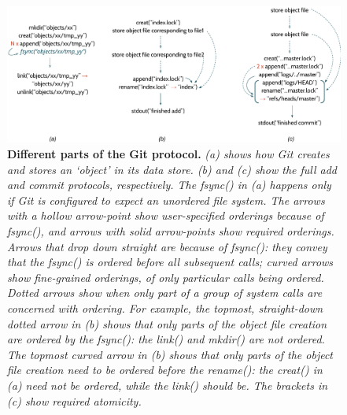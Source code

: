 \begin{figure}[t]
\centering
\includegraphics[width=\textwidth]{figs/git_cropped.pdf}
\caption{\textbf{Different parts of the Git protocol. }\textit{\footnotesize (a) shows how Git creates and stores an `object' in its data store. (b) and (c) show the full add and commit protocols, respectively. The fsync() in (a) happens only if Git is configured to expect an unordered file system. The arrows with a hollow arrow-point show user-specified orderings because of fsync(), and arrows with solid arrow-points show required orderings. Arrows that drop down straight are because of fsync(): they convey that the fsync() is ordered before all subsequent calls; curved arrows show fine-grained orderings, of only particular calls being ordered. Dotted arrows show when only part of a group of system calls are concerned with ordering. For example, the topmost, straight-down dotted arrow in (b) shows that only parts of the object file creation are ordered by the fsync(): the link() and mkdir() are not ordered. The topmost curved arrow in (b) shows that only parts of the object file creation \emph{need} to be ordered before the rename(): the creat() in (a) need not be ordered, while the link() should be. The brackets in (c) show required atomicity.}}
\label{fig-git-strace}
\end{figure}

